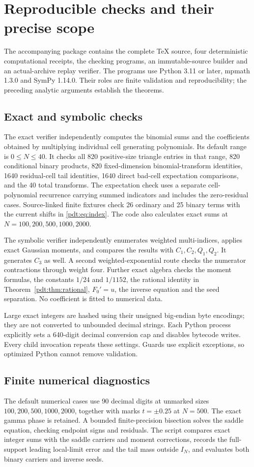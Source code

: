 \section{Reproducible checks and their precise scope}
\label{pdt:sec:checks}
The accompanying package contains the complete TeX source, four deterministic computational receipts, the checking programs, an immutable-source builder and an actual-archive replay verifier. The programs use Python 3.11 or later, mpmath 1.3.0 and SymPy 1.14.0. Their roles are finite validation and reproducibility; the preceding analytic arguments establish the theorems.

\subsection{Exact and symbolic checks}
The exact verifier independently computes the binomial sums and the coefficients obtained by multiplying individual cell generating polynomials. Its default range is $0\le N\le40$. It checks all 820 positive-size triangle entries in that range, 820 conditional binary products, 820 fixed-dimension binomial-transform identities, 1640 residual-cell tail identities, 1640 direct bad-cell expectation comparisons, and the 40 total transforms. The expectation check uses a separate cell-polynomial recurrence carrying summed indicators and includes the zero-residual cases. Source-linked finite fixtures check 26 ordinary and 25 binary terms with the current shifts in \eqref{pdt:eq:index}. The code also calculates exact sums at $N=100,200,500,1000,2000$.

The symbolic verifier independently enumerates weighted multi-indices, applies exact Gaussian moments, and compares the results with $C_1,C_2,Q_1,Q_2$. It generates $C_3$ as well. A second weighted-exponential route checks the numerator contractions through weight four. Further exact algebra checks the moment formulas, the constants $1/24$ and $1/1152$, the rational identity in Theorem~\ref{pdt:thm:rational}, $F_0'=u$, the inverse equation and the seed separation. No coefficient is fitted to numerical data.

Large exact integers are hashed using their unsigned big-endian byte encodings; they are not converted to unbounded decimal strings. Each Python process explicitly sets a 640-digit decimal conversion cap and disables bytecode writes. Every child invocation repeats these settings. Guards use explicit exceptions, so optimized Python cannot remove validation.

\subsection{Finite numerical diagnostics}
The default numerical cases use 90 decimal digits at unmarked sizes $100,200,500,1000,2000$, together with marks $t=\pm0.25$ at $N=500$. The exact gamma phase is retained. A bounded finite-precision bisection solves the saddle equation, checking endpoint signs and residuals. The script compares exact integer sums with the saddle carriers and moment corrections, records the full-support leading local-limit error and the tail mass outside $I_N$, and evaluates both binary carriers and inverse seeds.

